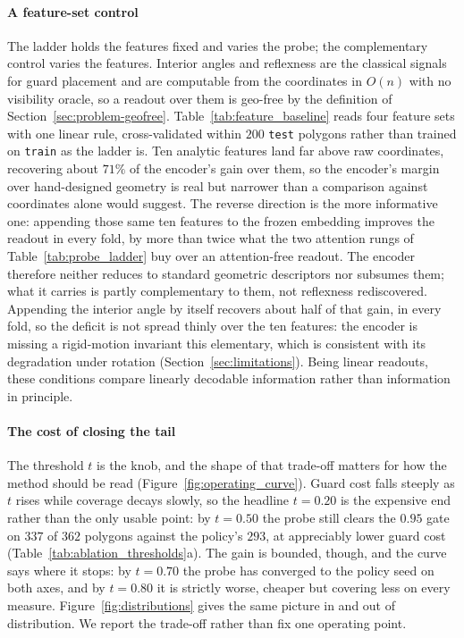 \documentclass[11pt]{article}
\begin{document}
\paragraph{A feature-set control} The ladder holds the features fixed and varies the probe; the complementary control varies the features. Interior angles and reflexness are the classical signals for guard placement and are computable from the coordinates in $O(n)$ with no visibility oracle, so a readout over them is geo-free by the definition of Section~\ref{sec:problem-geofree}. Table~\ref{tab:feature_baseline} reads four feature sets with one linear rule, cross-validated within $200$ \texttt{test} polygons rather than trained on \texttt{train} as the ladder is. Ten analytic features land far above raw coordinates, recovering about $71\%$ of the encoder's gain over them, so the encoder's margin over hand-designed geometry is real but narrower than a comparison against coordinates alone would suggest. The reverse direction is the more informative one: appending those same ten features to the frozen embedding improves the readout in every fold, by more than twice what the two attention rungs of Table~\ref{tab:probe_ladder} buy over an attention-free readout. The encoder therefore neither reduces to standard geometric descriptors nor subsumes them; what it carries is partly complementary to them, not reflexness rediscovered. Appending the interior angle by itself recovers about half of that gain, in every fold, so the deficit is not spread thinly over the ten features: the encoder is missing a rigid-motion invariant this elementary, which is consistent with its degradation under rotation (Section~\ref{sec:limitations}). Being linear readouts, these conditions compare linearly decodable information rather than information in principle.


\paragraph{The cost of closing the tail} The threshold $t$ is the knob, and the shape of that trade-off matters for how the method should be read (Figure~\ref{fig:operating_curve}). Guard cost falls steeply as $t$ rises while coverage decays slowly, so the headline $t = 0.20$ is the expensive end rather than the only usable point: by $t = 0.50$ the probe still clears the $0.95$ gate on $337$ of $362$ polygons against the policy's $293$, at appreciably lower guard cost (Table~\ref{tab:ablation_thresholds}a). The gain is bounded, though, and the curve says where it stops: by $t = 0.70$ the probe has converged to the policy seed on both axes, and by $t = 0.80$ it is strictly worse, cheaper but covering less on every measure. Figure~\ref{fig:distributions} gives the same picture in and out of distribution. We report the trade-off rather than fix one operating point.
\end{document}
